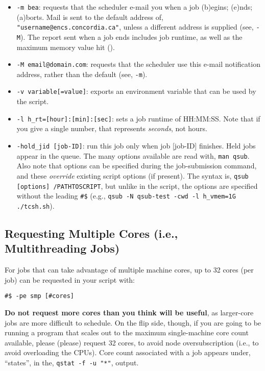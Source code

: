 \documentclass{easychair}
\begin{document}
\begin{itemize}
\item
\texttt{-m bea}: requests that the scheduler e-mail you when a job (b)egins; (e)nds; (a)borts.  Mail is sent to the default address of, \texttt{"username@encs.concordia.ca"}, unless a  different address is supplied (see, \texttt{-M}). The report sent when a job ends includes job 
runtime, as well as the maximum memory value hit (). 

\item
\texttt{-M email@domain.com}: requests that the scheduler use this e-mail notification address, rather than the default (see, \texttt{-m}). 

\item
\texttt{-v variable[=value]}: exports an environment variable that can be used by the script.

\item
\texttt{-l h\_rt=[hour]:[min]:[sec]}: sets a job runtime of HH:MM:SS. Note that if you give a single number, that represents \emph{seconds}, not hours. 

\item
\texttt{-hold\_jid [job-ID]}: run this job only when job [job-ID] finishes. Held jobs appear in the  queue. 
The many  options available are read with, \texttt{man qsub}. Also note that  options can be specified during the job-submission command, and these \emph{override}  existing script options (if present). The syntax is, \texttt{qsub [options] /PATHTOSCRIPT}, but  unlike in the script, the options are specified without the leading \verb+#$+ (e.g., \texttt{qsub -N  qsub-test -cwd -l h\_vmem=1G ./tcsh.sh}). 
\end{itemize}

\subsection{Requesting Multiple Cores (i.e., Multithreading Jobs)}

For jobs that can take advantage of multiple machine cores, up to 32 cores (per job) can be requested in your script with: 

\begin{verbatim}
#$ -pe smp [#cores] 
\end{verbatim}

\textbf{Do not request more cores than you think will be useful}, as larger-core jobs are more difficult to schedule. On the flip side, though, if you are going to be running a program that scales out to the maximum single-machine core count available, please (please) request 32 cores, to avoid node oversubscription (i.e., to avoid overloading the CPUs).  
Core count associated with a job appears under, ``states'', in the, \texttt{qstat -f -u "*"}, output.  
\end{document}
